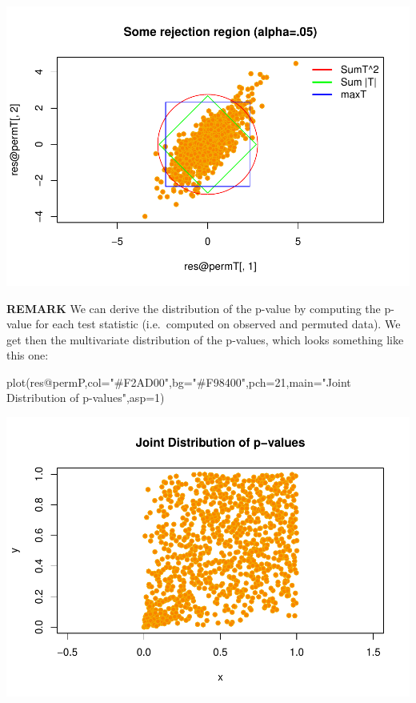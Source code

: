 \documentclass[
]{article}
\newenvironment{Shaded}{\begin{snugshade}}{\end{snugshade}}
\newcommand{\AttributeTok}[1]{\textcolor[rgb]{0.77,0.63,0.00}{#1}}
\newcommand{\DecValTok}[1]{\textcolor[rgb]{0.00,0.00,0.81}{#1}}
\newcommand{\FunctionTok}[1]{\textcolor[rgb]{0.00,0.00,0.00}{#1}}
\newcommand{\NormalTok}[1]{#1}
\newcommand{\SpecialCharTok}[1]{\textcolor[rgb]{0.00,0.00,0.00}{#1}}
\newcommand{\StringTok}[1]{\textcolor[rgb]{0.31,0.60,0.02}{#1}}
\begin{document}
\begin{center}\includegraphics{perm_files/figure-latex/unnamed-chunk-38-1} \end{center}

\textbf{REMARK} We can derive the distribution of the p-value by
computing the p-value for each test statistic (i.e.~computed on observed
and permuted data). We get then the multivariate distribution of the
p-values, which looks something like this one:

\begin{Shaded}
\begin{Highlighting}[]
\FunctionTok{plot}\NormalTok{(res}\SpecialCharTok{@}\NormalTok{permP,}\AttributeTok{col=}\StringTok{"\#F2AD00"}\NormalTok{,}\AttributeTok{bg=}\StringTok{"\#F98400"}\NormalTok{,}\AttributeTok{pch=}\DecValTok{21}\NormalTok{,}\AttributeTok{main=}\StringTok{"Joint Distribution of p{-}values"}\NormalTok{,}\AttributeTok{asp=}\DecValTok{1}\NormalTok{)}
\end{Highlighting}
\end{Shaded}

\begin{center}\includegraphics{perm_files/figure-latex/unnamed-chunk-39-1} \end{center}
\end{document}
